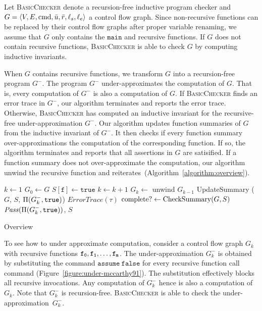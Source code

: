 
Let \textsc{BasicChecker} denote a recursion-free inductive program
checker and $G = \langle V, E,\textmd{cmd},\bar{u}, \bar{r},  \ell_s,  \ell_e \rangle$ a control flow graph. Since
non-recursive functions can be replaced by their control flow graphs
after proper variable renaming, we assume that $G$ only contains the
$\mathtt{main}$ and recursive functions. If $G$ does not contain
recursive functions, \textsc{BasicChecker} is able to check $G$ by
computing inductive invariants.

When $G$ contains recursive functions, we transform $G$ into a
recursion-free program $G^-$. The program $G^-$
under-approximates the computation of $G$. That is, every computation
of $G^-$ is also a computation of $G$. If
\textsc{BasicChecker} finds an error trace in $G^-$, our
algorithm terminates and reports the error trace. Otherwise,
\textsc{BasicChecker} has computed an inductive invariant for the
recursive-free under-approximation $G^-$. Our algorithm
updates function summaries of $G$ from the inductive invariant of
$G^-$. It then checks if every function summary
over-approximations the computation of the corresponding function. If
so, the algorithm terminates and reports that all assertions in $G$
are satisified. If a function summary does not over-approximate the
computation, our algorithm unwind the recursive function and
reiterates~(Algorithm~\ref{algorithm:overview}).

\begin{algorithm}
  $k \leftarrow 1$\;
  $G_0 \leftarrow G$\;
  {
    $S[\mathtt{f}] \leftarrow \mathtt{true}$\;
  }
  {
    $k \leftarrow k + 1$\;
    $G_{k} \leftarrow $ unwind $G_{k-1}$\;
    {
      {    
        UpdateSummary ($G$, $S$, $\Pi (G^-_k, \mathtt{true})$)\;
      }
      {
        \Return $\mathit{ErrorTrace} (\tau)$\;
      }
    }
    $\textmd{complete?} \leftarrow \textmd{CheckSummary} (G, S)$\;
  }
  \Return $\mathit{Pass} (\Pi (G^-_k, \mathtt{true}))$, $S$\;
  \caption{Overview}
  \label{algorithm:overview}
\end{algorithm}

To see how to under approximate computation, consider a control flow
graph $G_k$ with recursive functions $\mathtt{{f_0}}, \mathtt{{f_1}},
\ldots, \mathtt{{f_m}}$. The under-approximation $G^-_k$ is
obtained by substituting the command $\mathtt{assume\ false}$ for
every recursive function call command
(Figure~\ref{figure:under-mccarthy91}). The substitution
effectively blocks all recursive invocations. Any computation of
$G^-_k$ hence is also a computation of $G_k$. Note that
$G^-_k$ is recursion-free. \textsc{BasicChecker} is able to
check the under-approximation~$G^-_k$.

